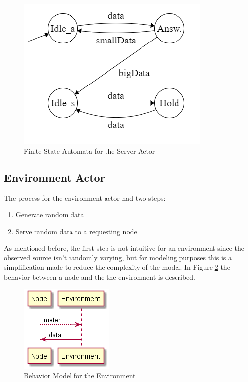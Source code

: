 
\begin{figure}[ht]
    \includegraphics{include/figures/server_actor_fsm}
    \caption{Finite State Automata for the Server Actor}
    \label{fig:server_states}
\end{figure}

\subsection{Environment Actor}

The process for the environment actor had two steps:

\begin{enumerate}
\item Generate random data
\item Serve random data to a requesting node 
\end{enumerate}

As mentioned before, the first step is not intuitive for an environment since the observed source isn't randomly varying, but for modeling purposes this is a simplification made to reduce the complexity of the model. In Figure \ref{fig:behav_example} the behavior between a node and the the environment is described.


\begin{figure}[ht]
    \includegraphics[]{include/figures/env_behav}
    \caption{Behavior Model for the Environment}
    \label{fig:behav_example}
\end{figure}

